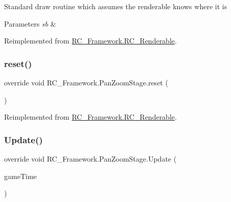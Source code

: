 Standard draw routine which assumes the renderable knows where it is 


\begin{DoxyParams}{Parameters}
{\em sb} & \\
\hline
\end{DoxyParams}


Reimplemented from \mbox{\hyperlink{class_r_c___framework_1_1_r_c___renderable_acc26db34e382a25a989c4c0dd0354b23}{R\+C\+\_\+\+Framework.\+R\+C\+\_\+\+Renderable}}.

\mbox{\label{class_r_c___framework_1_1_pan_zoom_stage_a9dc8dc75dab537e608713543ca314284}} 
\subsubsection{\texorpdfstring{reset()}{reset()}}
{\footnotesize\ttfamily override void R\+C\+\_\+\+Framework.\+Pan\+Zoom\+Stage.\+reset (\begin{DoxyParamCaption}{ }\end{DoxyParamCaption})\hspace{0.3cm}{\ttfamily [virtual]}}



Reimplemented from \mbox{\hyperlink{class_r_c___framework_1_1_r_c___renderable_ae65ce69704d15963789f421b58618b1f}{R\+C\+\_\+\+Framework.\+R\+C\+\_\+\+Renderable}}.

\mbox{\label{class_r_c___framework_1_1_pan_zoom_stage_a8463539aad705ab51a1ee3b7a64d3f35}} 
\subsubsection{\texorpdfstring{Update()}{Update()}}
{\footnotesize\ttfamily override void R\+C\+\_\+\+Framework.\+Pan\+Zoom\+Stage.\+Update (\begin{DoxyParamCaption}\item[{Game\+Time}]{game\+Time }\end{DoxyParamCaption})\hspace{0.3cm}{\ttfamily [virtual]}}



